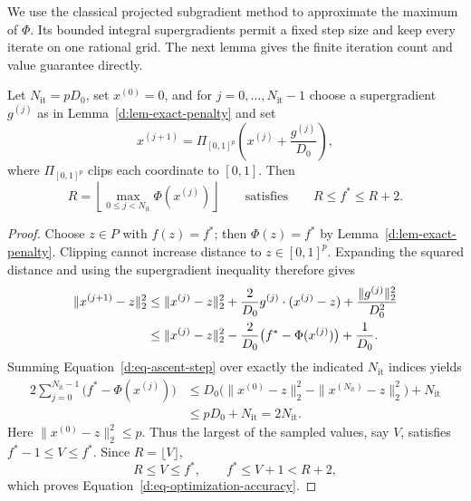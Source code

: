 We use the classical projected subgradient method
\citep[Equation~(1)]{Polyak1967} to approximate the maximum of \(\Phi\).
Its bounded integral supergradients permit a fixed step size and keep
every iterate on one rational grid. The next lemma gives the finite
iteration count and value guarantee directly.

\begin{lemma}
\label{d:lem-projected-ascent}
Let \(N_{\mathrm{it}}=pD_0\), set \(x^{(0)}=0\), and for
\(j=0,\ldots,N_{\mathrm{it}}-1\) choose a supergradient
\(g^{(j)}\) as in Lemma~\ref{d:lem-exact-penalty} and set
\begin{equation}
\label{d:eq-projected-iterations}
x^{(j+1)}
=\Pi_{[0,1]^p}\left(x^{(j)}+\frac{g^{(j)}}{D_0}\right),
\end{equation}
where \(\Pi_{[0,1]^p}\) clips each coordinate to \([0,1]\).
Then
\begin{equation}
\label{d:eq-optimization-accuracy}
R=\left\lfloor\max_{0\le j<N_{\mathrm{it}}}\Phi(x^{(j)})\right\rfloor
\qquad\text{satisfies}\qquad
R\le f^*\le R+2.
\end{equation}
\end{lemma}

\begin{proof}
Choose \(z\in P\) with \(f(z)=f^*\); then \(\Phi(z)=f^*\) by
Lemma~\ref{d:lem-exact-penalty}.  Clipping cannot increase distance to
\(z\in[0,1]^p\).  Expanding the squared distance and using the
supergradient inequality therefore gives
\begin{align}
\|x^{(j+1)}-z\|_2^2
&\le \|x^{(j)}-z\|_2^2
 +\frac{2}{D_0}g^{(j)}\cdot(x^{(j)}-z)
 +\frac{\|g^{(j)}\|_2^2}{D_0^2}\notag\\
&\le \|x^{(j)}-z\|_2^2
 -\frac{2}{D_0}\bigl(f^*-\Phi(x^{(j)})\bigr)+\frac1{D_0}.
\label{d:eq-ascent-step}
\end{align}
Summing Equation~\eqref{d:eq-ascent-step} over exactly the indicated
\(N_{\mathrm{it}}\) indices yields
\begin{align*}
2\sum_{j=0}^{N_{\mathrm{it}}-1}
  \bigl(f^*-\Phi(x^{(j)})\bigr)
&\le D_0\bigl(\|x^{(0)}-z\|_2^2
             -\|x^{(N_{\mathrm{it}})}-z\|_2^2\bigr)
       +N_{\mathrm{it}}\\
&\le pD_0+N_{\mathrm{it}}=2N_{\mathrm{it}}.
\end{align*}
Here \(\|x^{(0)}-z\|_2^2\le p\).
Thus the largest of the sampled values, say \(V\), satisfies
\(f^*-1\le V\le f^*\).  Since \(R=\lfloor V\rfloor\),
\[
R\le V\le f^*,
\qquad
f^*\le V+1<R+2,
\]
which proves Equation~\eqref{d:eq-optimization-accuracy}.
\end{proof}

